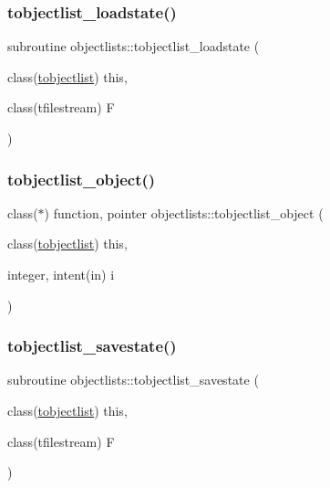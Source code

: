 \mbox{\label{namespaceobjectlists_a198a78c4eeeccbbfa31216f589beda86}} 
\subsubsection{\texorpdfstring{tobjectlist\+\_\+loadstate()}{tobjectlist\_loadstate()}}
{\footnotesize\ttfamily subroutine objectlists\+::tobjectlist\+\_\+loadstate (\begin{DoxyParamCaption}\item[{class(\mbox{\hyperlink{structobjectlists_1_1tobjectlist}{tobjectlist}})}]{this,  }\item[{class(tfilestream)}]{F }\end{DoxyParamCaption})\hspace{0.3cm}{\ttfamily [private]}}

\mbox{\label{namespaceobjectlists_a9a1de7415648fec93d3d27e8b3ad053f}} 
\subsubsection{\texorpdfstring{tobjectlist\+\_\+object()}{tobjectlist\_object()}}
{\footnotesize\ttfamily class($\ast$) function, pointer objectlists\+::tobjectlist\+\_\+object (\begin{DoxyParamCaption}\item[{class(\mbox{\hyperlink{structobjectlists_1_1tobjectlist}{tobjectlist}})}]{this,  }\item[{integer, intent(in)}]{i }\end{DoxyParamCaption})\hspace{0.3cm}{\ttfamily [private]}}

\mbox{\label{namespaceobjectlists_a5bd3b270e5c0f08c54a0a72838aa7b95}} 
\subsubsection{\texorpdfstring{tobjectlist\+\_\+savestate()}{tobjectlist\_savestate()}}
{\footnotesize\ttfamily subroutine objectlists\+::tobjectlist\+\_\+savestate (\begin{DoxyParamCaption}\item[{class(\mbox{\hyperlink{structobjectlists_1_1tobjectlist}{tobjectlist}})}]{this,  }\item[{class(tfilestream)}]{F }\end{DoxyParamCaption})\hspace{0.3cm}{\ttfamily [private]}}

